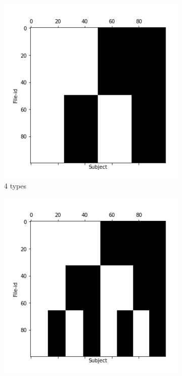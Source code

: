 \documentclass[10pt, conference, compsocconf]{IEEEtran}
\begin{document}
\begin{figure}
\begin{subfigure}[b]{0.45\columnwidth}
                  \includegraphics[width=\columnwidth]{data/Utility_Matrix/Synthetic/synthetic_subject_types/4_SubjectType_utility_matrix.png}
                  \caption{4 types}
        \end{subfigure}
                \begin{subfigure}[b]{0.45\columnwidth}
                  \includegraphics[width=\columnwidth]{data/Utility_Matrix/Synthetic/synthetic_subject_types/8_SubjectType_utility_matrix.png}

\end{subfigure}
\end{figure}
\end{document}

